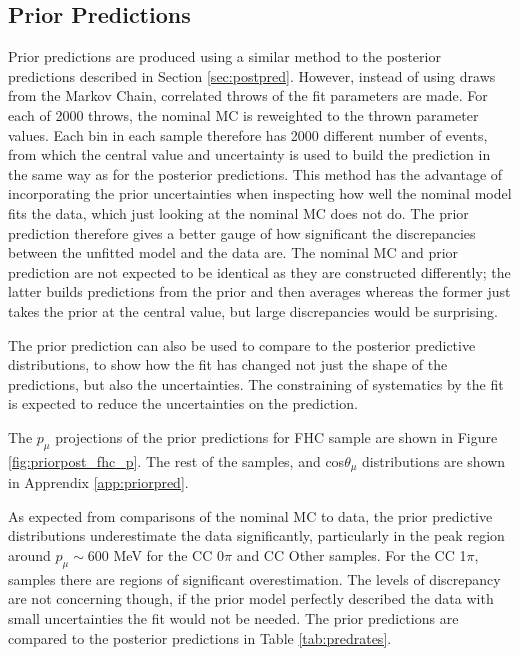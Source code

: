 \subsection{Prior Predictions}

Prior predictions are produced using a similar method to the posterior predictions described in Section \ref{sec:postpred}. However, instead of using draws from the Markov Chain, correlated throws of the fit parameters are made. For each of 2000 throws, the nominal MC is reweighted to the thrown parameter values. Each bin in each sample therefore has 2000 different number of events, from which the central value and uncertainty is used to build the prediction in the same way as for the posterior predictions. This method has the advantage of incorporating the prior uncertainties when inspecting how well the nominal model fits the data, which just looking at the nominal MC does not do. The prior prediction therefore gives a better gauge of how significant the discrepancies between the unfitted model and the data are. The nominal MC and prior prediction are not expected to be identical as they are constructed differently; the latter builds predictions from the prior and then averages whereas the former just takes the prior at the central value, but large discrepancies would be surprising.

The prior prediction can also be used to compare to the posterior predictive distributions, to show how the fit has changed not just the shape of the predictions, but also the uncertainties. The constraining of systematics by the fit is expected to reduce the uncertainties on the prediction.

The $p_{\mu}$ projections of the prior predictions for FHC sample are shown in Figure \ref{fig:priorpost_fhc_p}. The rest of the samples, and cos$\theta_{\mu}$ distributions are shown in Apprendix \ref{app:priorpred}.

As expected from comparisons of the nominal MC to data, the prior predictive distributions underestimate the data significantly, particularly in the peak region around $p_{\mu} \sim$600 MeV for the CC 0$\pi$ and CC Other samples. For the CC 1$\pi$, samples there are regions of significant overestimation. The levels of discrepancy are not concerning though, if the prior model perfectly described the data with small uncertainties the fit would not be needed. The prior predictions are compared to the posterior predictions in Table \ref{tab:predrates}.

